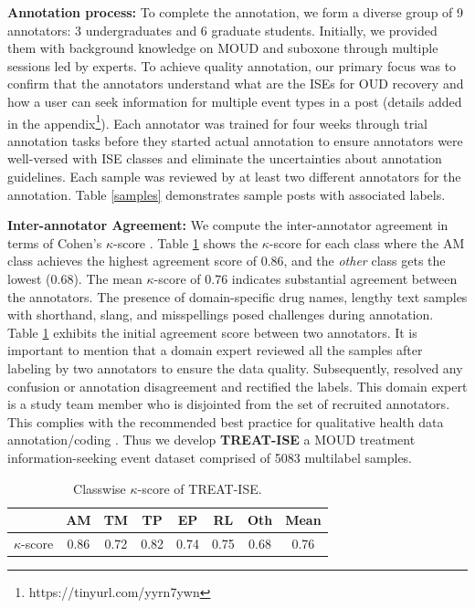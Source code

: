 \documentclass[letterpaper]{article} %
\begin{document}
\noindent
\textbf{Annotation process:} To complete the annotation, we form a diverse group of 9 annotators: 3 undergraduates and 6 graduate students. Initially, we provided them with background knowledge on MOUD and suboxone through multiple sessions led by experts. %
To achieve quality annotation, our primary focus was to confirm that the annotators understand what are the ISEs for OUD recovery and how a user can seek information for multiple event types in a post (details added in the appendix\footnote{https://tinyurl.com/yyrn7ywn}). Each annotator was trained for four weeks through trial annotation tasks before they started actual annotation to ensure annotators were well-versed with ISE classes and eliminate the uncertainties about annotation guidelines.  Each sample was reviewed by at least two different annotators for the annotation. Table \ref{samples} demonstrates sample posts with associated labels. 

\noindent
\textbf{Inter-annotator Agreement:} We compute the inter-annotator agreement in terms of Cohen's $\kappa$-score \cite{cohen1960coefficient}. Table \ref{kappa-score} shows the $\kappa$-score for each class where the AM class achieves the highest agreement score of 0.86, and the \textit{other} class gets the lowest (0.68). The mean $\kappa$-score of 0.76 indicates substantial agreement between the annotators. The presence of domain-specific drug names, lengthy text samples with shorthand, slang, and misspellings posed challenges during annotation. Table \ref{kappa-score} exhibits the initial agreement score between two annotators. 
It is important to mention that a domain expert reviewed all the samples after labeling by two annotators to ensure the data quality. Subsequently, resolved any confusion or annotation disagreement and rectified the labels. This domain expert is a study team member who is disjointed from the set of recruited annotators. This complies with the recommended best practice for qualitative health data annotation/coding \cite{busetto2020use}. Thus we develop \textbf{TREAT-ISE} a MOUD treatment information-seeking event dataset comprised of 5083 multilabel samples. 
\begin{table}[h!]
\centering
\footnotesize
\begin{tabular}{l|cccccc|c}
&\textbf{AM}&\textbf{TM}&\textbf{TP}&\textbf{EP} & \textbf{RL} & \textbf{Oth}&\textbf{Mean}\\
\midrule        
$\kappa$-score  & 0.86 &0.72 & 0.82 & 0.74 & 0.75 &0.68 & 0.76 \\
\hline

\end{tabular}
\caption{Classwise $\kappa$-score of TREAT-ISE.}
\label{kappa-score}
\end{table}
\end{document}
